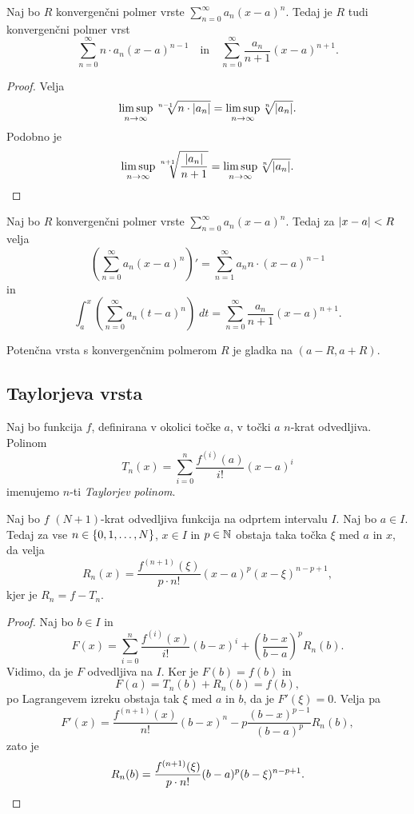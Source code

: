 \documentclass[12pt, a4paper]{article}
\begin{document}
\begin{trditev}
Naj bo $R$ konvergenčni polmer vrste $\displaystyle\sum_{n=0}^\infty a_n(x-a)^n$. Tedaj je $R$ tudi konvergenčni polmer vrst
\[
\sum_{n=0}^\infty n\cdot a_n(x-a)^{n-1}\quad\text{in}\quad \sum_{n=0}^\infty \frac{a_n}{n+1}(x-a)^{n+1}.
\]
\end{trditev}

\begin{proof}
Velja
\[
\limsup_{n\to\infty}\sqrt[n-1]{n\cdot \left\lvert a_n\right\rvert}=\limsup_{n\to\infty}\sqrt[n]{\left\lvert a_n\right\rvert}.
\]
Podobno je
\[
\limsup_{n\to\infty}\sqrt[n+1]{\frac{\left\lvert a_n\right\rvert}{n+1}}=\limsup_{n\to\infty}\sqrt[n]{\left\lvert a_n\right\rvert}.\qedhere
\]
\end{proof}

\begin{posledica}
Naj bo $R$ konvergenčni polmer vrste $\displaystyle\sum_{n=0}^\infty a_n(x-a)^n$. Tedaj za $\left\lvert x-a\right\rvert<R$ velja
\[
\left(\sum_{n=0}^\infty a_n(x-a)^n\right)'=\sum_{n=1}^\infty a_nn\cdot (x-a)^{n-1}
\]
in
\[
\int_a^x\left(\sum_{n=0}^\infty a_n(t-a)^n\right)\;dt=\sum_{n=0}^\infty\frac{a_n}{n+1}(x-a)^{n+1}.
\]
\end{posledica}

\begin{posledica}
Potenčna vrsta s konvergenčnim polmerom $R$ je gladka na $(a-R,a+R)$.
\end{posledica}

\newpage

\subsection{Taylorjeva vrsta}

\begin{definicija}
Naj bo funkcija $f$, definirana v okolici točke $a$, v točki $a$ $n$-krat odvedljiva. Polinom
\[
T_n(x)=\sum_{i=0}^n \frac{f^{(i)}(a)}{i!}(x-a)^i
\]
imenujemo $n$-ti \emph{Taylorjev polinom}.
\end{definicija}

\begin{izrek}[Taylor]
Naj bo $f$ $(N+1)$-krat odvedljiva funkcija na odprtem intervalu $I$. Naj bo $a\in I$. Tedaj za vse $n\in\left\{0,1,\dots,N\right\}$, $x\in I$ in $p\in\mathbb{N}$ obstaja taka točka $\xi$ med $a$ in $x$, da velja
\[
R_n(x)=\frac{f^{(n+1)}(\xi)}{p\cdot n!}(x-a)^p(x-\xi)^{n-p+1},
\]
kjer je $R_n=f-T_n$.
\end{izrek}

\begin{proof}
Naj bo $b\in I$ in
\[
F(x)=\sum_{i=0}^n\frac{f^{(i)}(x)}{i!}(b-x)^i+\left(\frac{b-x}{b-a}\right)^p R_n(b).
\]
Vidimo, da je $F$ odvedljiva na $I$. Ker je $F(b)=f(b)$ in
\[
F(a)=T_n(b)+R_n(b)=f(b),
\]
po Lagrangevem izreku obstaja tak $\xi$ med $a$ in $b$, da je $F'(\xi)=0$. Velja pa
\[
F'(x)=\frac{f^{(n+1)}(x)}{n!}(b-x)^n-p\frac{(b-x)^{p-1}}{(b-a)^p}R_n(b),
\]
zato je
\[
R_n(b)=\frac{f^{(n+1)}(\xi)}{p\cdot n!}(b-a)^p(b-\xi)^{n-p+1}.\qedhere
\]
\end{proof}
\end{document}
